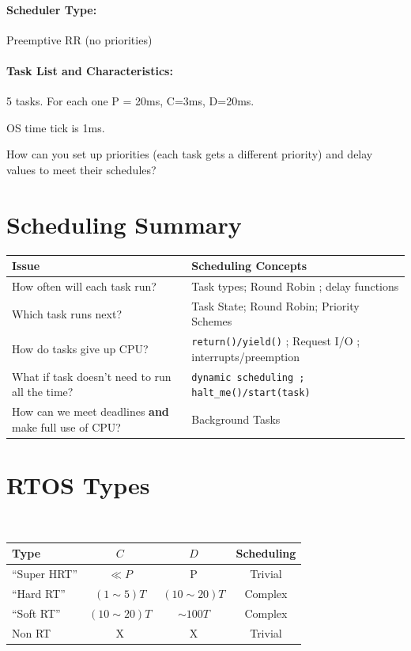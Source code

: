 \documentclass{article}	%
\begin{document}
\paragraph{Scheduler Type:} Preemptive RR (no priorities)
\paragraph{Task List and Characteristics:}  
            \begin{description} 
               \item 5 tasks. For each one P = 20ms, C=3ms, D=20ms. 
  	       \item OS time tick is 1ms.
            \end{description}

How can you set up priorities (each task gets a different priority) and delay values to meet their schedules?
 


\section{Scheduling Summary}


\begin{tabular}{|p{1.75in}|p{1.75in}|}
\hline
Issue                   & Scheduling Concepts    \\ \hline
How often will each task run? & Task types; Round Robin ; delay functions      \\ \hline
Which task runs next?         & Task State; Round Robin; Priority Schemes   \\\hline
How do tasks give up CPU?       & {\tt return()/yield()} ; Request I/O ;
                                       interrupts/preemption\\\hline
What if task doesn't need to run all the time?
                                & {\tt  dynamic scheduling ; halt\_me()/start(task)} \\\hline
How can we meet deadlines {\bf and} make full use of CPU?
                                & Background Tasks \\\hline
\end{tabular}



\section{RTOS Types}

{\tt
\begin{tabular}{|l|c|c|c|}
\hline
Type            & $C$               & $D$           & Scheduling        \\
\hline``Super HRT''   &  $\ll P$    & P             & Trivial           \\ \hline
``Hard RT''     &  $(1 \sim 5)T$        & $(10 \sim 20)T$        & Complex      \\ \hline
``Soft RT''     &  $(10 \sim 20)T$       & $\sim100T$    & Complex          \\ \hline
Non RT          &   X               & X             & Trivial           \\ \hline
\end{tabular}
}
\end{document}
